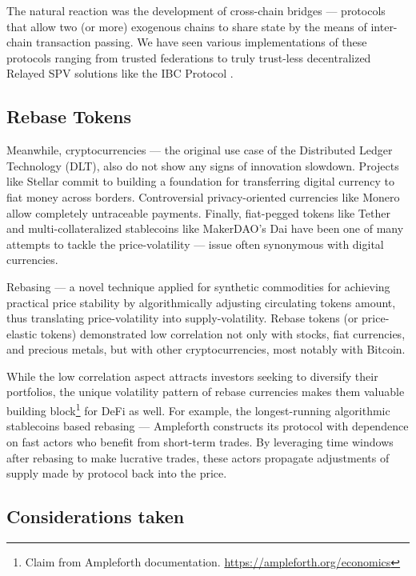 \documentclass{article}
\begin{document}
The natural reaction was the development of cross-chain bridges --- protocols that allow two (or more) exogenous chains to share state by the means of inter-chain transaction passing. We have seen various implementations of these protocols ranging from trusted federations to truly trust-less decentralized Relayed SPV solutions like the IBC Protocol \cite{goes2020ibc}.

\subsection{Rebase Tokens}

Meanwhile, cryptocurrencies --- the original use case of the Distributed Ledger Technology (DLT), also do not show any signs of innovation slowdown. Projects like Stellar \cite{mazieres2016stellar} commit to building a foundation for transferring digital currency to fiat money across borders. Controversial privacy-oriented currencies like Monero \cite{saberhagen2013monero} allow completely untraceable payments. Finally, fiat-pegged tokens like Tether \cite{tether2016} and multi-collateralized stablecoins like MakerDAO's Dai \cite{makerdao2020dai} have been one of many attempts to tackle the price-volatility --- issue often synonymous with digital currencies.

Rebasing --- a novel technique applied for synthetic commodities for achieving practical price stability by algorithmically adjusting circulating tokens amount, thus translating price-volatility into supply-volatility. Rebase tokens (or price-elastic tokens) demonstrated low correlation not only with stocks, fiat currencies, and precious metals, but with other cryptocurrencies, most notably with Bitcoin.

While the low correlation aspect attracts investors seeking to diversify their portfolios, the unique volatility pattern of rebase currencies makes them valuable building block\footnote{Claim from Ampleforth documentation. \url{https://ampleforth.org/economics}} for DeFi as well. For example, the longest-running algorithmic stablecoins based rebasing --- Ampleforth \cite{kuo2019ampleforth} constructs its protocol with dependence on fast actors who benefit from short-term trades. By leveraging time windows after rebasing to make lucrative trades, these actors propagate adjustments of supply made by protocol back into the price.

\subsection{Considerations taken}
\end{document}
